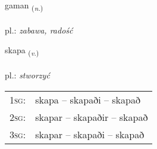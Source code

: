 \documentclass[frontgrid, backgrid]{flacards}\usepackage[]{graphicx}\usepackage[]{xcolor}
\begin{document}
\renewcommand{\flhead}{\vskip5pt \fboxsep=0pt {\small\bfseries\footnotesize Nafnorð | Noun}}
\renewcommand{\fcfoot}{\vskip5pt \fboxsep=0pt \hspace{2pt}{\small\bfseries\footnotesize 1K}}

\renewcommand{\blhead}{\vskip5pt {\small\bfseries\footnotesize Nafnorð | Noun }}
\renewcommand{\bcfoot}{\vskip5pt \hspace{2pt}{\small\bfseries\footnotesize 1K}}


{gaman \small{\textsubscript{(\textit{n.})}} \\[1ex] %
\textphonetic{[kaːman]} \\
pl.: \emph{zabawa, radość} \\  [2ex]
\renewcommand*{\arraystretch}{0.8}
}

\renewcommand{\flhead}{\vskip5pt \fboxsep=0pt {\small\bfseries\footnotesize Sagnorð | Verb}}
\renewcommand{\fcfoot}{\vskip5pt \fboxsep=0pt \hspace{2pt}{\small\bfseries\footnotesize 1K}}

\renewcommand{\blhead}{\vskip5pt {\small\bfseries\footnotesize Sagnorð | Verb }}
\renewcommand{\bcfoot}{\vskip5pt \hspace{2pt}{\small\bfseries\footnotesize 1K}}


{skapa \small{\textsubscript{(\textit{v.})}} \\[1ex] %
\textphonetic{[skaːpa]} \\
pl.: \emph{stworzyć} \\  [2ex]
\renewcommand*{\arraystretch}{0.8}
\begin{tabular}{p{1cm}l}
\textsc{1sg}: & skapa -- skapaði -- skapað \\ 
\textsc{2sg}: & skapar -- skapaðir -- skapað \\ 
\textsc{3sg}: & skapar -- skapaði -- skapað \\ 
\end{tabular}
}
\end{document}
